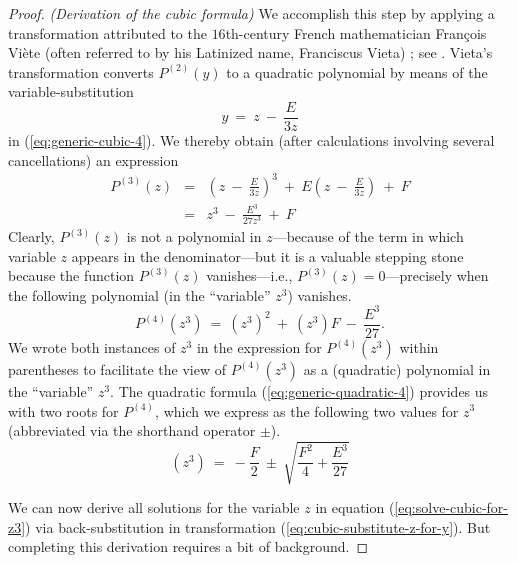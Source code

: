 \begin{proof} {\it (Derivation of the cubic formula)}
\noindent
We accomplish this step by applying a transformation attributed to the
$16$th-century French mathematician Fran\c{c}ois Vi\`{e}te
 (often referred to by his Latinized
name, Franciscus Vieta) ; see
\cite{Hazewinkel}.  Vieta's transformation converts $P^{(2)}(y)$ to a
quadratic polynomial by means of the variable-substitution
\begin{equation}
\label{eq:cubic-substitute-z-for-y}
y \ = \ z \ - \ \frac{E}{3z}
\end{equation}
in (\ref{eq:generic-cubic-4}).  We thereby obtain (after calculations
involving several cancellations) an expression
\begin{eqnarray}
\nonumber
P^{(3)}(z) & = & \left( z \ - \ \frac{E}{3z} \right)^3
\ + \ E \left(z \ - \ \frac{E}{3z} \right) \ + \ F \\
\label{eq:generic-cubic-5}
  & = &
z^3 \ - \ \frac{E^3}{27z^3}  \ + \ F
\end{eqnarray}
Clearly, $P^{(3)}(z)$ is not a polynomial in $z$---because of the term
in which variable $z$ appears in the denominator---but it is a
valuable stepping stone because the function $P^{(3)}(z)$
vanishes---i.e., $P^{(3)}(z) = 0$---precisely when the following
polynomial (in the ``variable'' $z^3$) vanishes.
\[ P^{(4)}(z^3) \ = \ (z^3)^2 \ + \ (z^3) F \ - \ \frac{E^3}{27}. \]
We wrote both instances of $z^3$ in the expression for $P^{(4)}(z^3)$
within parentheses to facilitate the view of $P^{(4)}(z^3)$ as a
(quadratic) polynomial in the ``variable'' $z^3$.  The quadratic
formula (\ref{eq:generic-quadratic-4}) provides us with two roots for
$P^{(4)}$, which we express as the following two values for $z^3$
(abbreviated via the shorthand operator $\pm$).
\begin{equation}
\label{eq:solve-cubic-for-z3}
(z^3) \ = \
- \frac{F}{2} \ \pm \ \sqrt{\frac{F^2}{4} + \frac{E^3}{27}}
\end{equation}

We can now derive all solutions for the variable $z$ in equation
(\ref{eq:solve-cubic-for-z3}) via back-substitution in transformation
(\ref{eq:cubic-substitute-z-for-y}).  But completing this derivation
requires a bit of background.


\end{proof}
